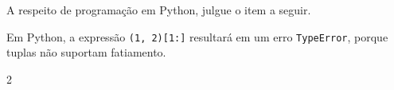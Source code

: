 
{%
\item \rtask \ponto{\pt} 
A respeito de programação em Python, julgue o item a seguir.

Em Python, a expressão \lstinline[style=Python]|(1, 2)[1:]| resultará em um erro \lstinline[style=Python]|TypeError|, porque tuplas não suportam fatiamento.

{\setlength{\columnsep}{0pt}\renewcommand{\columnseprule}{0pt}
\begin{multicols}{2}
\begin{answerlist}[label={\texttt{\Alph*}.},leftmargin=*]
    \ti[V.]
    \ifnum{}\doneitem[F.]\else\ti[F.]\fi %
\end{answerlist}
\end{multicols}
}

}


